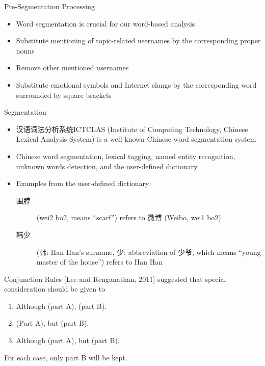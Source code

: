 \documentclass[12pt, trans]{beamer}
\newcommand{\1}[1]{{\mathbf 1}\left\{#1\right\}}        %
\begin{document}
\begin{frame}{Pre-Segmentation Processing}

\begin{itemize}[<+->]
\item Word segmentation is crucial for our word-based analysis
\item Substitute mentioning of topic-related usernames by the corresponding proper nouns
\item Remove other mentioned usernames
\item Substitute emotional symbols and Internet slangs  by the corresponding word surrounded by square brackets
\end{itemize}

\end{frame}


\begin{frame}{Segmentation}

\begin{itemize}[<+->]
\item  汉语词法分析系统ICTCLAS (Institute of Computing Technology, Chinese Lexical Analysis System) is a well known Chinese word segmentation system 
\item Chinese word segmentation, lexical tagging, named entity recognition, unknown words detection, and the user-defined dictionary
\item Examples from the user-defined dictionary:
\begin{description}
\item[围脖] (wei2 bo2, means ``scarf'') refers to 微博 (Weibo, wei1 bo2)
\item[韩少] (韩: Han Han's surname, 少: abbreviation of 少爷, which means ``young master of the house'') refers to Han Han
\end{description}

\end{itemize}

\end{frame}

\begin{frame}{Conjunction Rules}
[Lee and Renganathan, 2011] suggested that special consideration should be given to
\begin{block}{}
\begin{enumerate}
\item Although (part A), (part B).
\item (Part A), but (part B).
\item Although (part A), but (part B).
\end{enumerate}
\end{block}
For each case, only part B will be kept.
\end{frame}
\end{document}
